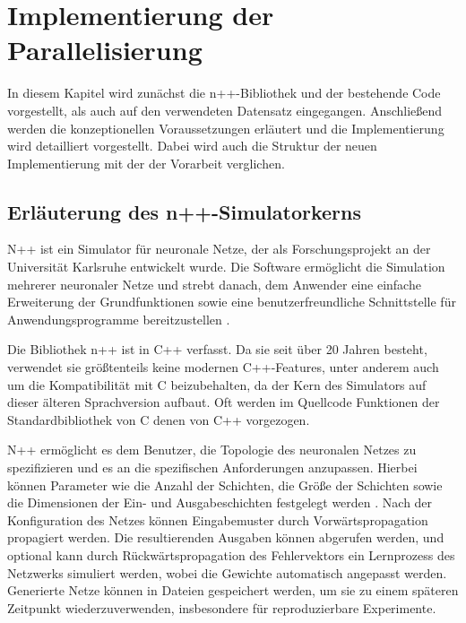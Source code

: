\chapter{Implementierung der Parallelisierung}
\label{ch:Implementierung_Parallelisierung_Npp}

In diesem Kapitel wird zunächst die n++-Bibliothek und der bestehende Code vorgestellt, als auch auf den verwendeten Datensatz eingegangen. Anschließend werden die konzeptionellen Voraussetzungen erläutert und die Implementierung wird detailliert vorgestellt. Dabei wird auch die Struktur der neuen Implementierung mit der der Vorarbeit verglichen.

\section{Erläuterung des n++-Simulatorkerns}
\label{sec:Erlauterung_Npp}
N++ ist ein Simulator für neuronale Netze, der als Forschungsprojekt an der Universität Karlsruhe entwickelt wurde. Die Software ermöglicht die Simulation mehrerer neuronaler Netze und strebt danach, dem Anwender eine einfache Erweiterung der Grundfunktionen sowie eine benutzerfreundliche Schnittstelle für Anwendungsprogramme bereitzustellen \citep{Riedmiller_RPROP}.

Die Bibliothek n++ ist in C++ verfasst. Da sie seit über 20 Jahren besteht, verwendet sie größtenteils keine modernen C++-Features, unter anderem auch um die Kompatibilität mit C beizubehalten, da der Kern des Simulators auf dieser älteren Sprachversion aufbaut. Oft werden im Quellcode Funktionen der Standardbibliothek von C denen von C++ vorgezogen.

N++ ermöglicht es dem Benutzer, die Topologie des neuronalen Netzes zu spezifizieren und es an die spezifischen Anforderungen anzupassen. Hierbei können Parameter wie die Anzahl der Schichten, die Größe der Schichten sowie die Dimensionen der Ein- und Ausgabeschichten festgelegt werden \citep{dokumentation_npp}. Nach der Konfiguration des Netzes können Eingabemuster durch Vorwärtspropagation propagiert werden. Die resultierenden Ausgaben können abgerufen werden, und optional kann durch Rückwärtspropagation des Fehlervektors ein Lernprozess des Netzwerks simuliert werden, wobei die Gewichte automatisch angepasst werden. Generierte Netze können in Dateien gespeichert werden, um sie zu einem späteren Zeitpunkt wiederzuverwenden, insbesondere für reproduzierbare Experimente.

